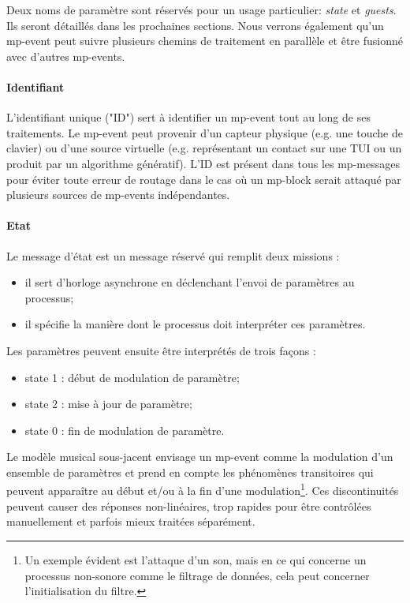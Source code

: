 Deux noms de paramètre sont réservés pour un usage particulier: \textit{state} et \textit{guests}. Ils seront détaillés dans les prochaines sections. Nous verrons également qu'un mp-event peut suivre plusieurs chemins de traitement en parallèle et être fusionné avec d'autres mp-events. 

\paragraph{Identifiant}
L'identifiant unique ("ID") sert à identifier un mp-event tout au long de ses traitements. Le mp-event peut provenir d'un capteur physique (e.g. une touche de clavier) ou d'une source virtuelle (e.g. représentant un contact sur une TUI ou un produit par un algorithme génératif).
L'ID est présent dans tous les mp-messages pour éviter toute erreur de routage dans le cas où un mp-block serait attaqué par plusieurs sources de mp-events indépendantes.

\paragraph{Etat}
Le message d'état est un message réservé qui remplit deux missions :
\vspace{-1em}
\begin{itemize}[noitemsep]
	\item il sert d'horloge asynchrone en déclenchant l'envoi de paramètres au processus;
	\item il spécifie la manière dont le processus doit interpréter ces paramètres.
\end{itemize}

Les paramètres peuvent ensuite être interprétés de trois façons :
\vspace{-1em}
\begin{itemize}[noitemsep]
	\item state 1 : début de modulation de paramètre;
	\item state 2 : mise à jour de paramètre;
	\item state 0 : fin de modulation de paramètre.	
\end{itemize}

Le modèle musical sous-jacent envisage un mp-event comme la modulation d'un ensemble de paramètres et prend en compte les phénomènes transitoires qui peuvent apparaître au début et/ou à la fin d'une modulation\footnote{ Un exemple évident est l'attaque d'un son, mais en ce qui concerne un processus non-sonore comme le filtrage de données, cela peut concerner l'initialisation du filtre.}. Ces discontinuités peuvent causer des réponses non-linéaires, trop rapides pour être contrôlées manuellement et parfois mieux traitées séparément.

